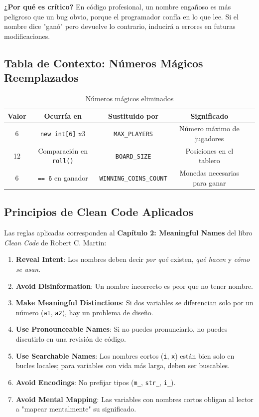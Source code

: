 \textbf{¿Por qué es crítico?} En código profesional, un nombre engañoso es más peligroso que un bug obvio, porque el programador confía en lo que lee. Si el nombre dice "ganó" pero devuelve lo contrario, inducirá a errores en futuras modificaciones.

\subsection{Tabla de Contexto: Números Mágicos Reemplazados}

\begin{table}[h]
\centering
\caption{Números mágicos eliminados}
\label{tab:magic-numbers}
\begin{tabular}{|c|c|c|c|c|}
\hline
\textbf{Valor} & \textbf{Ocurría en} & \textbf{Sustituido por} & \textbf{Significado} \\
\hline
6 & \texttt{new int[6]} x3 & \texttt{MAX\_PLAYERS} & Número máximo de jugadores \\ \hline
12 & Comparación en \texttt{roll()} & \texttt{BOARD\_SIZE} & Posiciones en el tablero \\ \hline
6 & \texttt{== 6} en ganador & \texttt{WINNING\_COINS\_COUNT} & Monedas necesarias para ganar \\
\hline
\end{tabular}
\end{table}

\subsection{Principios de Clean Code Aplicados}

Las reglas aplicadas corresponden al \textbf{Capítulo 2: Meaningful Names} del libro \textit{Clean Code} de Robert C. Martin:

\begin{enumerate}
    \item \textbf{Reveal Intent}: Los nombres deben decir \textit{por qué} existen, \textit{qué hacen} y \textit{cómo se usan}.
    \item \textbf{Avoid Disinformation}: Un nombre incorrecto es peor que no tener nombre.
    \item \textbf{Make Meaningful Distinctions}: Si dos variables se diferencian solo por un número (\texttt{a1}, \texttt{a2}), hay un problema de diseño.
    \item \textbf{Use Pronounceable Names}: Si no puedes pronunciarlo, no puedes discutirlo en una revisión de código.
    \item \textbf{Use Searchable Names}: Los nombres cortos (\texttt{i}, \texttt{x}) están bien solo en bucles locales; para variables con vida más larga, deben ser buscables.
    \item \textbf{Avoid Encodings}: No prefijar tipos (\texttt{m\_}, \texttt{str\_}, \texttt{i\_}).
    \item \textbf{Avoid Mental Mapping}: Las variables con nombres cortos obligan al lector a "mapear mentalmente" su significado.
\end{enumerate}

